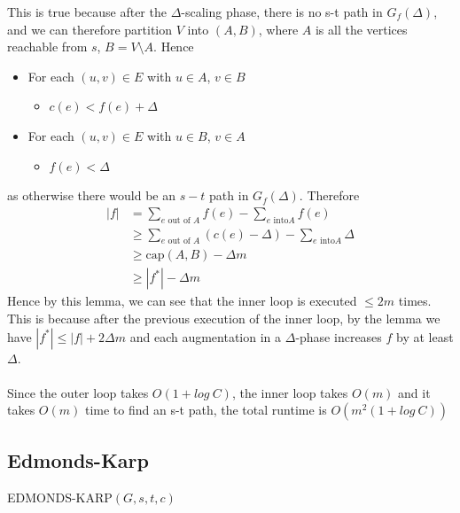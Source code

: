\documentclass{article}
\theoremstyle{plain}
\theoremstyle{definition}
\begin{document}
         This is true because after the $\Delta$-scaling phase, there is no s-t path in $G_f(\Delta)$, and we can therefore partition $V$ into $(A, B)$, where $A$ is all the vertices reachable from $s$, $B = V \setminus A$. Hence
        \begin{itemize}
            \item For each $(u,v) \in E$ with $u \in A$, $v \in B$
            \begin{itemize}
                \item $c(e) < f(e) + \Delta$
            \end{itemize}
            \item For each $(u,v) \in E$ with $u \in B$, $v \in A$
            \begin{itemize}
                \item $f(e) < \Delta$
            \end{itemize}
        \end{itemize}
        as otherwise there would be an $s-t$ path in $G_f(\Delta)$. Therefore
        \begin{align*}
            |f| &= \sum_{e \text{ out of } A} f(e) - \sum_{e \text{ into} A} f(e)\\ 
            &\geq \sum_{e \text{ out of } A} (c(e) - \Delta) - \sum_{e \text{ into} A} \Delta \\ 
            &\geq \text{cap}(A,B) - \Delta m \\
            &\geq |f^*| - \Delta m
        \end{align*}
        Hence by this lemma, we can see that the inner loop is executed $\leq 2m$ times. This is because after the previous execution of the inner loop, by the lemma we have $|f^*| \leq |f| + 2 \Delta m$ and each augmentation in a $\Delta$-phase increases $f$ by at least $\Delta$. \\ \\ 
        Since the outer loop takes $O(1 + log \ C)$, the inner loop takes $O(m)$ and it takes $O(m)$ time to find an s-t path, the total runtime is $O(m^2 (1 + log \ C))$
    \subsection{Edmonds-Karp}
        EDMONDS-KARP$(G,s,t,c)$
        \begin{algorithmic}[1]
            \EndWhile
        \end{algorithmic}
\end{document}
